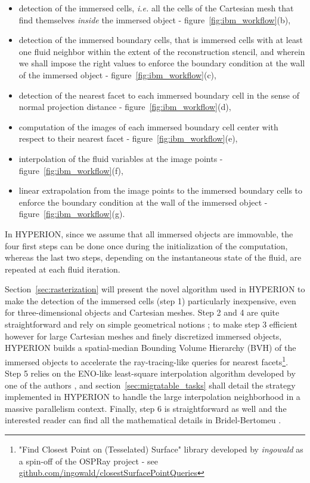 \begin{itemize}
    \item detection of the immersed cells, \emph{i.e.} all the cells of the Cartesian mesh that find themselves \emph{inside} the immersed object - figure~\ref{fig:ibm_workflow}(b),
    \item detection of the immersed boundary cells, that is immersed cells with at least one fluid neighbor within the extent of the reconstruction stencil, and wherein we shall impose the right values to enforce the boundary condition at the wall of the immersed object - figure~\ref{fig:ibm_workflow}(c),
    \item detection of the nearest facet to each immersed boundary cell in the sense of normal projection distance - figure~\ref{fig:ibm_workflow}(d),
    \item computation of the images of each immersed boundary cell center with respect to their nearest facet - figure~\ref{fig:ibm_workflow}(e),
    \item interpolation of the fluid variables at the image points - figure~\ref{fig:ibm_workflow}(f),
    \item linear extrapolation from the image points to the immersed boundary cells to enforce the boundary condition at the wall of the immersed object - figure~\ref{fig:ibm_workflow}(g).
\end{itemize}

In HYPERION, since we assume that all immersed objects are immovable, the four first steps can be done once during the initialization of the computation, whereas the last two steps, depending on the instantaneous state of the fluid, are repeated at each fluid iteration.

Section~\ref{sec:rasterization} will present the novel algorithm used in HYPERION to make the detection of the immersed cells (step 1) particularly inexpensive, even for three-dimensional objects and Cartesian meshes.
Step 2 and 4 are quite straightforward and rely on simple geometrical notions ; to make step 3 efficient however for large Cartesian meshes and finely discretized immersed objects, HYPERION builds a spatial-median Bounding Volume Hierarchy (BVH) of the immersed objects to accelerate the ray-tracing-like queries for nearest facets\footnote{"Find Closest Point on (Tesselated) Surface" library developed by \emph{ingowald} as a spin-off of the OSPRay project - see \url{github.com/ingowald/closestSurfacePointQueries}}.
Step 5 relies on the ENO-like least-square interpolation algorithm developed by one of the authors \cite{BRIDELBERTOMEU2021}, and section~\ref{sec:migratable_tasks} shall detail the strategy implemented in HYPERION to handle the large interpolation neighborhood in a massive parallelism context.
Finally, step 6 is straightforward as well and the interested reader can find all the mathematical details in Bridel-Bertomeu \cite{BRIDELBERTOMEU2021}.

